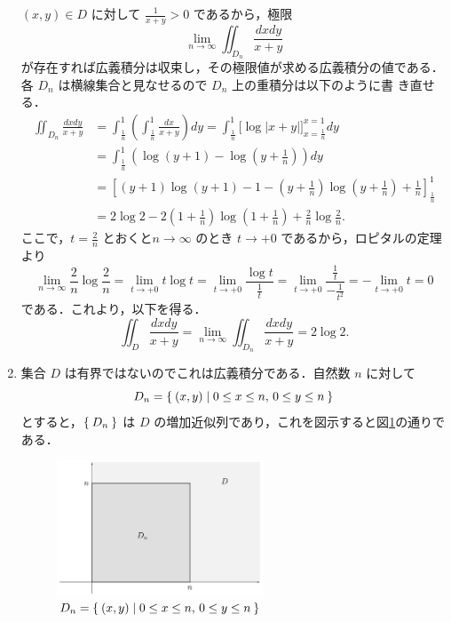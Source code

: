 \documentclass[11pt, uplatex, dvipdfmx]{jsarticle}
\begin{document}
\begin{enumerate}[(1)]
     $(x,y) \in D$ に対して $\frac{1}{x+y} >0$ であるから，極限
     \[
       \lim_{n \to \infty} \iint_{D_n} \frac{dx dy}{x+y}
     \]
     が存在すれば広義積分は収束し，その極限値が求める広義積分の値である．
     各 $D_n$ は横線集合と見なせるので $D_n$ 上の重積分は以下のように書
     き直せる．
     \begin{align*}
       \iint_{D_n} \frac{dx dy}{x+y} 
       &= \int_{\frac{1}{n}}^{1} \left( \int_{\frac{1}{n}}^{1} \frac{dx}{x+y}\right) dy
         = \int_{\frac{1}{n}}^{1} \Big[ \log |x+y| \Big]_{x=\frac{1}{n}}^{x=1}  dy\\
       &= \int_{\frac{1}{n}}^{1} \left( \log\left(y+1\right)-\log\left(y+\frac{1}{n}\right)\right) dy\\
       &= \left[ \left( y+1 \right) \log \left(y+1\right) -1 -\left( y+\frac{1}{n}\right)\log\left(y+\frac{1}{n}\right)
         +\frac{1}{n}\right]_{\frac{1}{n}}^{1}\\
       &= 2\log 2 - 2\left(1+\frac{1}{n}\right) \log \left(1+\frac{1}{n}\right) + \frac{2}{n}\log\frac{2}{n}.
     \end{align*}
     ここで，$t=\frac{2}{n}$ とおくと$n \to \infty$ のとき $t \to +0$ であるから，ロピタルの定理より
     \[
       \lim_{n \to \infty} \frac{2}{n} \log \frac{2}{n} = \lim_{t \to +0} t \log t = \lim_{t \to +0} \frac{\log t}{\frac{1}{t}}
       = \lim_{t \to +0} \frac{\frac{1}{t}}{-\frac{1}{t^2}} = -\lim_{t \to +0} t = 0
     \]
     である．これより，以下を得る．
     \[
       \iint_{D} \frac{dx dy}{x+y} = \lim_{n \to \infty} \iint_{D_n} \frac{dx dy}{x+y} = 2 \log 2.
     \]
 


   \item 集合 $D$ は有界ではないのでこれは広義積分である．自然数 $n$ に対して
     \[
       D_n =\Set{ (x,y) |  0 \leq x \leq n, \, 0 \leq y \leq n }
     \]
     とすると，$\Set{D_n}$ は $D$ の増加近似列であり，これを図示すると図\ref{fig:no17}の通りである．
     \begin{figure}[h]
       \centering
       \includegraphics[height=4cm]{./pictures/no17.pdf}
       \caption{ $D_n=\Set{(x,y)  |  0 \leq x \leq n, \, 0 \leq y \leq n}$}\label{fig:no17}
     \end{figure}


\end{enumerate}
\end{document}

